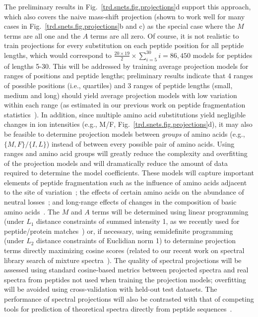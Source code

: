 \documentclass[arial,11pt]{article}
\begin{document}
The preliminary results in Fig.~\ref{trd.snets.fig.projections}d support this approach, which also covers the naive mass-shift projection (shown to work well for many cases in Fig.~\ref{trd.snets.fig.projections}b and c) as the special case where the $M$ terms are all one and the $A$ terms are all zero.
%
Of course, it is not realistic to train projections for every substitution on each peptide position for all peptide lengths, which would correspond to $\frac{20\times 19}{2}\times\sum_{i=5}^{30} i = 86,450$ models for peptides of lengths 5-30. This will be addressed by training average projection models for ranges of positions and peptide lengths; preliminary results indicate that 4 ranges of possible positions (i.e., quartiles) and 3 ranges of peptide lengths (small, medium and long) should yield average projection models with low variation within each range (as estimated in our previous work on peptide fragmentation statistics~\cite{kim09msdict,kim10cidetd}). In addition, since multiple amino acid substitutions yield negligible changes in ion intensities (e.g., M/F, Fig.~\ref{trd.snets.fig.projections}d), it may also be feasible to determine projection models between {\em groups} of amino acids (e.g., $\{M,F\}/\{I,L\}$) instead of between every possible pair of amino acids. Using ranges and amino acid groups will greatly reduce the complexity and overfitting of the projection models and will dramatically reduce the amount of data required to determine the model coefficients.
%
These models will capture important elements of peptide fragmentation such as the influence of amino acids adjacent to the site of variation~\cite{tabb03b,huang05,barton07,breci03,kapp03}; the effects of certain amino acids on the abundance of neutral losses~\cite{tabb03b,martin05,savitski07,elias04}; and long-range effects of changes in the composition of basic amino acids~\cite{kapp03,huang05,tabb04,frank09ranks}.
%
The $M$ and $A$ terms will be determined using linear programming (under $L_1$ distance constraints of summed intensity 1, as we recently used for peptide/protein matches~\cite{dost09}) or, if necessary, using semidefinite programming (under $L_2$ distance constraints of Euclidian norm 1) to determine projection terms directly maximizing cosine scores (related to our recent work on spectral library search of mixture spectra~\cite{wang10}).
%
The quality of spectral projections will be assessed using standard cosine-based metrics between projected spectra and real spectra from peptides not used when training the projection models; overfitting will be avoided using cross-validation with held-out test datasets.
%
The performance of spectral projections will also be contrasted with that of competing tools for prediction of theoretical spectra directly from peptide sequences~\cite{zhang04,elias04,zhang05,klammer08,frank09ranks,zhang10}.
\end{document}
